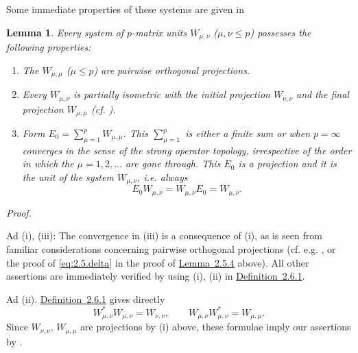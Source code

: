 \documentclass[b5paper,twoside]{article}
\newcommand{\lemref}[2]{\hyperref[#1]{\mbox{Lemma~#2}}}
\newcommand{\defref}[2]{\hyperref[#1]{\mbox{Definition~#2}}}
\theoremstyle{mvnplain}
\newtheorem{lemma}{Lemma}[section]
\renewenvironment{proof}[1][Proof]{%
  \par\addvspace{0.35\baselineskip}%
  \noindent\textit{#1.}\ \normalfont\ignorespaces
}{%
  \par\addvspace{0.35\baselineskip}%
}
\begin{document}
Some immediate properties of these systems are given in
\begin{lemma}\label{lem:2.6.1}
Every system of $p$-matrix units $W_{\mu,\nu}$ ($\mu,\nu\leq p$) possesses
the following properties:
\begin{enumerate}[label=(\roman*)]
\item The $W_{\mu,\mu}$ ($\mu\leq p$) are pairwise orthogonal projections.
\item Every $W_{\mu,\nu}$ is partially isometric with the initial projection
$W_{\nu,\nu}$ and the final projection $W_{\mu,\mu}$ (cf.
\cite[\S4.3]{ref5}).
\item Form $E_0=\sum_{\mu=1}^{p}W_{\mu,\mu}$.  This $\sum_{\mu=1}^{p}$ is
either a finite sum or when $p=\infty$ converges in the sense of the strong
operator topology, irrespective of the order in which the
$\mu=1,2,\ldots$ are gone through.  This $E_0$ is a projection and it is the
unit of the system $W_{\mu,\nu}$, i.e. always
\[
  E_0W_{\mu,\nu}=W_{\mu,\nu}E_0=W_{\mu,\nu}.
\]
\end{enumerate}
\end{lemma}
\begin{proof}
Ad (i), (iii): The convergence in (iii) is a consequence of (i), as is seen
from familiar considerations concerning pairwise orthogonal projections
(cf. e.g. \cite[pp.~76--78]{ref5}, or the proof of
\eqref{eq:2.5.delta} in the proof of \lemref{lem:2.5.4}{2.5.4} above).  All
other assertions are immediately verified by using (i), (ii) in
\defref{def:2.6.1}{2.6.1}.

Ad (ii).  \defref{def:2.6.1}{2.6.1} gives directly
\[
  W_{\mu,\nu}^{*}W_{\mu,\nu}=W_{\nu,\nu},
  \qquad
  W_{\mu,\nu}W_{\mu,\nu}^{*}=W_{\mu,\mu}.
\]
Since $W_{\nu,\nu}$, $W_{\mu,\mu}$ are projections by (i) above, these
formulae imply our assertions by \cite[p.~142, Lemma~4.3.2 (the last two
criteria), and p.~141, Lemma~4.3.1]{ref5}.
\end{proof}
\end{document}

